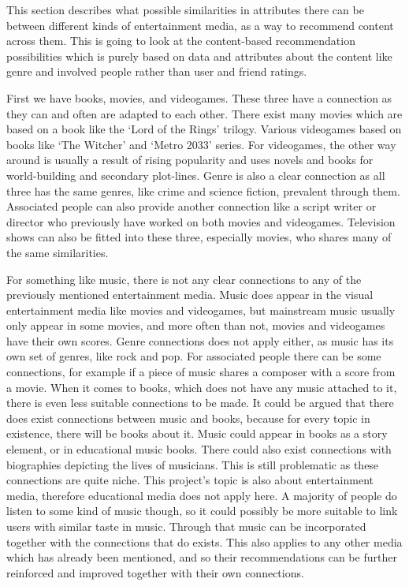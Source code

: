 This section describes what possible similarities in attributes there can be between different kinds of entertainment media, as a way to recommend content across them. This is going to look at the content-based recommendation possibilities which is purely based on data and attributes about the content like genre and involved people rather than user and friend ratings.

First we have books, movies, and videogames. These three have a connection as they can and often are adapted to each other. There exist many movies which are based on a book like the ‘Lord of the Rings’ trilogy. Various videogames based on books like ‘The Witcher’ and ‘Metro 2033’ series. For videogames, the other way around is usually a result of rising popularity and uses novels and books for world-building and secondary plot-lines. Genre is also a clear connection as all three has the same genres, like crime and science fiction, prevalent through them. Associated people can also provide another connection like a script writer or director who previously have worked on both movies and videogames. Television shows can also be fitted into these three, especially movies, who shares many of the same similarities.

For something like music, there is not any clear connections to any of the previously mentioned entertainment media. Music does appear in the visual entertainment media like movies and videogames, but mainstream music usually only appear in some movies, and more often than not, movies and videogames have their own scores. Genre connections does not apply either, as music has its own set of genres, like rock and pop. For associated people there can be some connections, for example if a piece of music shares a composer with a score from a movie. When it comes to books, which does not have any music attached to it, there is even less suitable connections to be made. It could be argued that there does exist connections between music and books, because for every topic in existence, there will be books about it. Music could appear in books as a story element, or in educational music books. There could also exist connections with biographies depicting the lives of musicians. This is still problematic as these connections are quite niche. This project’s topic is also about entertainment media, therefore educational media does not apply here. A majority of people do listen to some kind of music though, so it could possibly be more suitable to link users with similar taste in music. Through that music can be incorporated together with the connections that do exists. This also applies to any other media which has already been mentioned, and so their recommendations can be further reinforced and improved together with their own connections.

